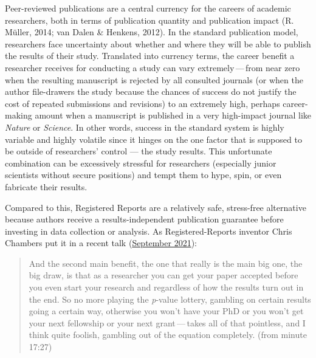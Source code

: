 \documentclass[
  ,man,mask,floatsintext]{apa6}
\begin{document}
Peer-reviewed publications are a central currency for the careers of academic researchers, both in terms of publication quantity and publication impact (R. Müller, 2014; van Dalen \& Henkens, 2012).
In the standard publication model, researchers face uncertainty about whether and where they will be able to publish the results of their study. Translated into currency terms, the career benefit a researcher receives for conducting a study can vary extremely\(\,\)---\(\,\)from near zero when the resulting manuscript is rejected by all consulted journals (or when the author file-drawers the study because the chances of success do not justify the cost of repeated submissions and revisions) to an extremely high, perhaps career-making amount when a manuscript is published in a very high-impact journal like \emph{Nature} or \emph{Science}.
In other words, success in the standard system is highly variable and highly volatile since it hinges on the one factor that is supposed to be outside of researchers' control --- the study results.
This unfortunate combination can be excessively stressful for researchers (especially junior scientists without secure positions) and tempt them to hype, spin, or even fabricate their results.

Compared to this, Registered Reports are a relatively safe, stress-free alternative because authors receive a results-independent publication guarantee before investing in data collection or analysis.
As Registered-Reports inventor Chris Chambers put it in a recent talk (\href{https://youtu.be/FiVI3cwVMZI?list=PLChfyH8TVDGmYENpXUDPaeeq2SLh8q9dt\&t=1047}{September 2021}):

\begin{quote}
And the second main benefit, the one that really is the main big one, the big draw, is that as a researcher you can get your paper accepted before you even start your research and regardless of how the results turn out in the end. So no more playing the \emph{p}-value lottery, gambling on certain results going a certain way, otherwise you won't have your PhD or you won't get your next fellowship or your next grant\(\,\)---\(\,\)takes all of that pointless, and I think quite foolish, gambling out of the equation completely. (from minute 17:27)
\end{quote}
\end{document}
